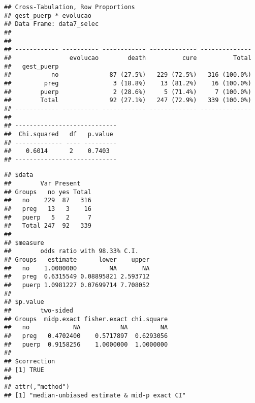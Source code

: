 \documentclass[
]{article}
\newenvironment{Shaded}{\begin{snugshade}}{\end{snugshade}}
\newcommand{\DataTypeTok}[1]{\textcolor[rgb]{0.13,0.29,0.53}{#1}}
\newcommand{\KeywordTok}[1]{\textcolor[rgb]{0.13,0.29,0.53}{\textbf{#1}}}
\newcommand{\NormalTok}[1]{#1}
\newcommand{\OperatorTok}[1]{\textcolor[rgb]{0.81,0.36,0.00}{\textbf{#1}}}
\newcommand{\OtherTok}[1]{\textcolor[rgb]{0.56,0.35,0.01}{#1}}
\newcommand{\StringTok}[1]{\textcolor[rgb]{0.31,0.60,0.02}{#1}}
\begin{document}
\begin{Shaded}
\end{Shaded}

\begin{verbatim}
## Cross-Tabulation, Row Proportions  
## gest_puerp * evolucao  
## Data Frame: data7_selec  
## 
## 
## ------------ ---------- ------------ ------------- --------------
##                evolucao        death          cure          Total
##   gest_puerp                                                     
##           no              87 (27.5%)   229 (72.5%)   316 (100.0%)
##         preg               3 (18.8%)    13 (81.2%)    16 (100.0%)
##        puerp               2 (28.6%)     5 (71.4%)     7 (100.0%)
##        Total              92 (27.1%)   247 (72.9%)   339 (100.0%)
## ------------ ---------- ------------ ------------- --------------
## 
## ----------------------------
##  Chi.squared   df   p.value 
## ------------- ---- ---------
##    0.6014      2    0.7403  
## ----------------------------
\end{verbatim}

\begin{Shaded}
\end{Shaded}

\begin{verbatim}
## $data
##        Var Present
## Groups   no yes Total
##   no    229  87   316
##   preg   13   3    16
##   puerp   5   2     7
##   Total 247  92   339
## 
## $measure
##        odds ratio with 98.33% C.I.
## Groups   estimate      lower    upper
##   no    1.0000000         NA       NA
##   preg  0.6315549 0.08895821 2.593712
##   puerp 1.0981227 0.07699714 7.708052
## 
## $p.value
##        two-sided
## Groups  midp.exact fisher.exact chi.square
##   no            NA           NA         NA
##   preg   0.4702400    0.5717897  0.6293056
##   puerp  0.9158256    1.0000000  1.0000000
## 
## $correction
## [1] TRUE
## 
## attr(,"method")
## [1] "median-unbiased estimate & mid-p exact CI"
\end{verbatim}
\end{document}
